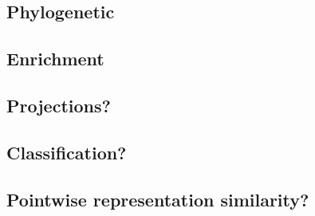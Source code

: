 \documentclass[12pt, letterpaper, twocolumn]{article}
\begin{document}
\subsection{Phylogenetic}
\subsection{Enrichment}
\subsection{Projections?}
\subsection{Classification?}
\subsection{Pointwise representation similarity?}

\onecolumn
\newpage
\FloatBarrier


\end{document}
